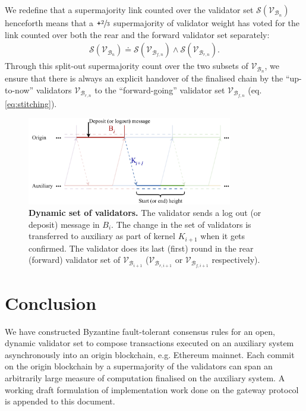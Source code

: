 \documentclass[12pt,a4paper]{article}
\begin{document}
We redefine that a supermajority link counted over the validator set $\mathcal{S}(\mathcal{V}_{\mathcal{B}_n})$ henceforth means that a $\texttt{+}\sfrac{2}{3}$ supermajority of validator weight has voted for the link counted over both the rear and the forward validator set separately:
\begin{align}
  \label{eq:supermajority}
  \mathcal{S}(\mathcal{V}_{\mathcal{B}_n}) \doteq \mathcal{S}(\mathcal{V}_{\mathcal{B}_{f,n}}) \land \mathcal{S}(\mathcal{V}_{\mathcal{B}_{r,n}}).
\end{align}
Through this split-out supermajority count over the two subsets of $\mathcal{V}_{\mathcal{B}_{n}}$, we ensure that there is always an explicit handover of the finalised chain by the ``up-to-now'' validators $\mathcal{V}_{\mathcal{B}_{r,n}}$ to the ``forward-going'' validator set $\mathcal{V}_{\mathcal{B}_{f,n}}$ (eq. \ref{eq:stitching}).
\begin{figure}[htb]
    \centering
	\includegraphics[width=0.8\textwidth]{dynamic_validators}
	\caption{\textbf{Dynamic set of validators.}
		The validator sends a log out (or deposit) message in $B_i$.
		The change in the set of validators is transferred to auxiliary as part of kernel $K_{i+1}$ when it gets confirmed.
		The validator does its last (first) round in the rear (forward) validator set of $\mathcal{V}_{\mathcal{B}_{i+1}}$ ($\mathcal{V}_{\mathcal{B}_{r,i+1}}$ or $\mathcal{V}_{\mathcal{B}_{f,i+1}}$ respectively).}
	\label{fig:dynamic_validators}
\end{figure}

%
%
\section*{Conclusion}
We have constructed Byzantine fault-tolerant consensus rules for an open, dynamic validator set to compose transactions executed on an auxiliary system asynchronously into an origin blockchain, e.g. Ethereum mainnet.
Each commit on the origin blockchain by a supermajority of the validators can span an arbitrarily large measure of computation finalised on the auxiliary system. A working draft formulation of implementation work done on the gateway protocol is appended to this document.
\end{document}
